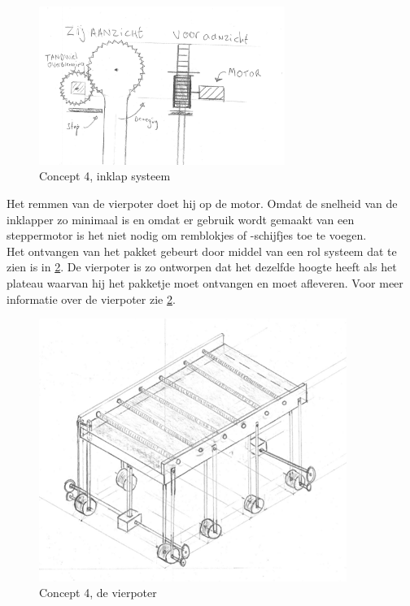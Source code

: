 \begin{figure}[H]
    \centering
    \includegraphics[width = 80mm]{04_idee_ontwikkeling/Opklapsysteem_met_tandwiel.png}
    \caption{Concept 4, inklap systeem}
    \label{fig:vierpoter_inklapsysteem}
\end{figure}

Het remmen van de vierpoter doet hij op de motor. Omdat de snelheid van de inklapper zo minimaal is en omdat er gebruik wordt gemaakt van een steppermotor is het niet nodig om remblokjes of -schijfjes toe te voegen.\\
Het ontvangen van het pakket gebeurt door middel van een rol systeem dat te zien is in \cref{fig:vierpoter_totaal}. De vierpoter is zo ontworpen dat het dezelfde hoogte heeft als het plateau waarvan hij het pakketje moet ontvangen en moet afleveren. Voor meer informatie over de vierpoter zie \cref{fig:vierpoter_totaal}. \\

 
\begin{figure}[H]
    \centering
    \includegraphics[width = 100mm]{04_idee_ontwikkeling/Foto_vierpoter.PNG}
    \caption{Concept 4, de vierpoter}
    \label{fig:vierpoter_totaal}
\end{figure}
